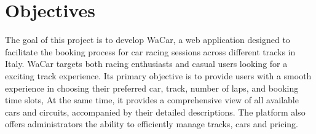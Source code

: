\section{Objectives}

The goal of this project is to develop WaCar, a web application designed to facilitate the booking process for car racing sessions across different tracks in Italy.
WaCar targets both racing enthusiasts and casual users looking for a exciting track experience.
Its primary objective is to provide users with a smooth experience in choosing their preferred car, track, number of laps, and booking time slots, 
At the same time, it provides a comprehensive view of all available cars and circuits, accompanied by their detailed descriptions.
The platform also offers administrators the ability to efficiently manage tracks, cars and pricing.